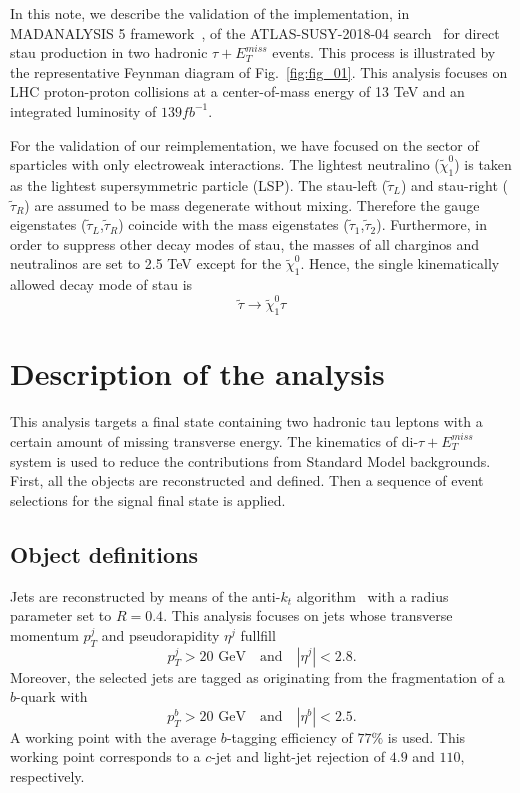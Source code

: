 \documentclass{ws-mpla}
\begin{document}
In this note, we describe the validation of the implementation, in MADANALYSIS 5 framework~\cite{Conte:2018vmg,Dumont:2014tja,Conte:2014zja,Conte:2012fm}, of the ATLAS-SUSY-2018-04 search~\cite{Aad:2019byo} for direct stau production in two hadronic $\tau +E^{miss}_T$ events. 
This process is illustrated by the representative Feynman diagram of Fig.~\ref{fig:fig_01}. 
This analysis focuses on LHC proton-proton collisions at a center-of-mass energy of 13 TeV and an integrated luminosity of $139 fb^{-1}$.

For the validation of our reimplementation, we have focused on the sector of sparticles with only electroweak interactions. 
The lightest neutralino ($\tilde{\chi}^0_1$) is taken as the lightest supersymmetric particle (LSP). 
The stau-left ($\tilde{\tau}_L$) and stau-right ($\tilde{\tau}_R$) are assumed to be mass degenerate without mixing.  Therefore the gauge eigenstates ($\tilde{\tau}_L$,$\tilde{\tau}_R$) coincide with the mass eigenstates ($\tilde{\tau}_1$,$\tilde{\tau}_2$). 
Furthermore, in order to suppress other decay modes of stau, the masses of all charginos and neutralinos are set to 2.5 TeV except for the $\tilde{\chi}^0_1$. 
Hence, the single kinematically allowed decay mode of stau is 
\begin{equation}
\tilde{\tau}\rightarrow\tilde{\chi}^0_1 \tau 
\end{equation}
 

\section{Description of the analysis}

This analysis targets a final state containing two hadronic tau leptons with a certain amount of missing transverse energy. 
The kinematics of di-$\tau +E^{miss}_T$ system is used to reduce the contributions from Standard Model backgrounds. 
First, all the objects are reconstructed and defined. Then a sequence of event selections for the signal final state is applied.

\subsection{Object definitions}

Jets are reconstructed by means of the anti-$k_t$ algorithm~\cite{Cacciari:2008gp} with a radius parameter set to $R=0.4$. This analysis focuses on jets whose transverse momentum $p^j_T$ and pseudorapidity $\eta^j$ fullfill
\begin{equation}
p^j_T > 20 \textrm{ GeV}\quad \textrm{and}\quad |\eta^j| < 2.8.
\end{equation} 
Moreover, the selected jets are tagged as originating from the fragmentation of a $b$-quark with 
\begin{equation}
p^b_T > 20 \textrm{ GeV}\quad \textrm{and}\quad |\eta^b| < 2.5.
\end{equation}
A working point with the average $b$-tagging efficiency of $77\%$ is used. This working point corresponds to a $c$-jet and light-jet rejection of $4.9$ and $110$, respectively.
\end{document}
